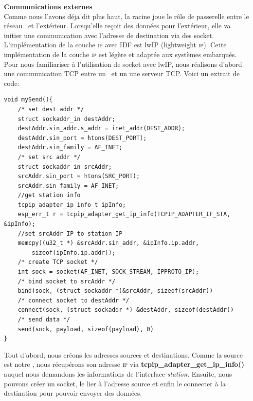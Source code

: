         \vspace{0.5cm}
        \textbf{\underline{Communications externes}}\\
            Comme nous l'avons déja dit plus haut, la racine joue le rôle de passerelle entre le réseau \espmesh\ 
            et l'extérieur. Lorsqu'elle reçoit des données pour l'extérieur, elle va initier une communication avec l'adresse
            de destination via des socket. L'implémentation de la couche \textsc{ip} avec IDF est lwIP (lightweight \textsc{ip}).
            Cette implémentation de la couche \textsc{ip} est légère et adaptée aux systèmes embarqués. Pour nous familiariser à l'utilisation
            de socket avec lwIP, nous réalisons d'abord une communication TCP entre un \esp\ et un une serveur TCP.
            Voici un extrait de code: 
            \begin{verbatim}
void mySend(){
    /* set dest addr */
    struct sockaddr_in destAddr;
    destAddr.sin_addr.s_addr = inet_addr(DEST_ADDR);
    destAddr.sin_port = htons(DEST_PORT);
    destAddr.sin_family = AF_INET;
    /* set src addr */
    struct sockaddr_in srcAddr;
    srcAddr.sin_port = htons(SRC_PORT);
    srcAddr.sin_family = AF_INET;
    //get station info
    tcpip_adapter_ip_info_t ipInfo;
    esp_err_t r = tcpip_adapter_get_ip_info(TCPIP_ADAPTER_IF_STA, &ipInfo);
    //set srcAddr IP to station IP
    memcpy((u32_t *) &srcAddr.sin_addr, &ipInfo.ip.addr, 
        sizeof(ipInfo.ip.addr));
    /* create TCP socket */
    int sock = socket(AF_INET, SOCK_STREAM, IPPROTO_IP);
    /* bind socket to srcAddr */
    bind(sock, (struct sockaddr *)&srcAddr, sizeof(srcAddr))
    /* connect socket to destAddr */
    connect(sock, (struct sockaddr *) &destAddr, sizeof(destAddr))
    /* send data */
    send(sock, payload, sizeof(payload), 0)
}
            \end{verbatim}

            Tout d'abord, nous créons les adresses sources et destinations. Comme la source est notre \esp,
            nous récupérons son adresse \textsc{ip} via \textbf{tcpip\_adapter\_get\_ip\_info()} auquel nous demandons
            les informations de l'interface \textit{station}. Ensuite, nous pouvons créer un socket, le lier à l'adresse
            source et enfin le connecter à la destination pour pouvoir envoyer des données.

